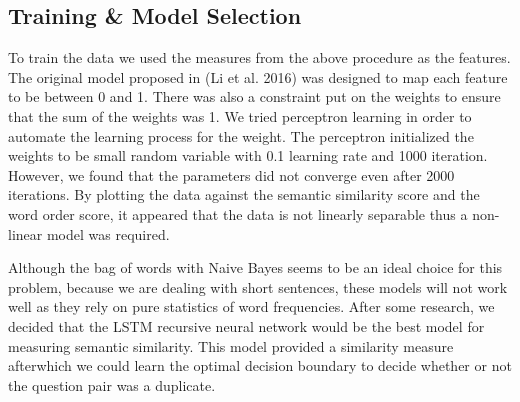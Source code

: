 \subsection{Training \& Model Selection}
To train the data we used the measures from the above procedure as the features. The original model proposed in (Li et al. 2016) was designed to map each feature to be between 0 and 1. There was also a constraint put on the weights to ensure that the sum of the weights was 1. We tried perceptron learning in order to automate the learning process for the weight. The perceptron initialized the weights to be small random variable with 0.1 learning rate and 1000 iteration. However, we found that the parameters did not converge even after 2000 iterations. By plotting the data against the semantic similarity score and the word order score, it appeared that the data is not linearly separable thus a non-linear model was required. 

Although the bag of words with Naive Bayes seems to be an ideal choice for this problem, because we are dealing with short sentences, these models will not work well as they rely on pure statistics of word frequencies.
After some research, we decided that the LSTM recursive neural network would be the best model for measuring semantic similarity. This model provided a similarity measure afterwhich we could learn the optimal decision boundary to decide whether or not the question pair was a duplicate.